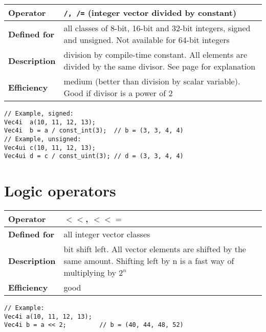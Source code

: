 \documentclass[vcl_manual.tex]{subfiles}
\begin{document}
\begin{tabular}{|p{25mm}|p{100mm}|}
\hline
\bfseries Operator & \texttt{/, /=}  (integer vector divided by constant) \\ \hline
\bfseries Defined for & all classes of 8-bit, 16-bit and 32-bit integers, signed and unsigned. Not available for 64-bit integers \\ \hline
\bfseries Description & division by compile-time constant. All elements are divided by the same divisor. See page \pageref{IntegerDivision} for explanation \\ \hline
\bfseries Efficiency & medium (better than division by scalar variable). \newline Good if divisor is a power of 2 \\ \hline
\end{tabular}
\begin{lstlisting}[frame=none]
// Example, signed:
Vec4i  a(10, 11, 12, 13);
Vec4i  b = a / const_int(3);  // b = (3, 3, 4, 4)
// Example, unsigned:
Vec4ui c(10, 11, 12, 13);
Vec4ui d = c / const_uint(3); // d = (3, 3, 4, 4)
\end{lstlisting}


\section{Logic operators} \label{LogicOperators}

\begin{tabular}{|p{25mm}|p{100mm}|}
\hline
\bfseries Operator & $<<$, $<<=$ \\ \hline
\bfseries Defined for & all integer vector classes \\ \hline
\bfseries Description & bit shift left. All vector elements are shifted by the same amount. \newline
Shifting left by n is a fast way of multiplying by $2^n$ \\ \hline
\bfseries Efficiency & good \\ \hline
\end{tabular}
\begin{lstlisting}[frame=none]
// Example:
Vec4i a(10, 11, 12, 13);
Vec4i b = a << 2;         // b = (40, 44, 48, 52)
\end{lstlisting}
\end{document}
